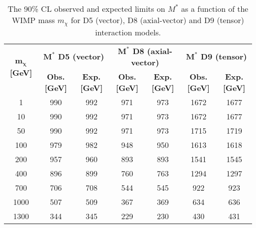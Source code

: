 \begin{sidewaystable}[h!]
\centering
\begin{tabular}{c|cc|cc|cc}
\hline\hline
\multirow{2}{*}{{\bf $\mathbf{m_\chi}$ [GeV]}} & \multicolumn{2}{c|}{\bf $\mathbf{M^*}$ D5 (vector)} & \multicolumn{2}{c|}{\bf $\mathbf{M^*}$ D8 (axial-vector)} & \multicolumn{2}{c}{\bf $\mathbf{M^*}$ D9 (tensor)}\\ 
\cline{2-7}
           & {\bf Obs. [GeV]} & {\bf Exp. [GeV]} & {\bf Obs. [GeV]} & {\bf Exp. [GeV]} & {\bf Obs. [GeV]} & {\bf Exp. [GeV]}\\ 
\hline
    1      &    990 &   992 &   971 &   973 &   1672    &   1677    \\
    10     &    990 &   992 &   971 &   973 &   1672    &   1677    \\
    50     &    990 &   992 &   971 &   973 &   1715    &   1719    \\
    100 &   979 &   982 &   948 &   950 &   1613    &   1618    \\
    200 &   957 &   960 &   893 &   893 &   1541    &   1545    \\
    400 &   896 &   899 &   760 &   763 &   1294    &   1297    \\
    700 &   706 &   708 &   544 &   545 &   922 &   923 \\
    1000    &   507 &   509 &   367 &   369 &   634 &   636 \\
    1300    &   344 &   345 &   229     &   230     &   430 &   431     \\
    \hline\hline
    \end{tabular}
    \caption[The 90\% CL observed and expected limits on $M^*$ as a function of the WIMP mass $m_\chi$ for different interaction models.]{The 90\% CL observed and expected limits on $M^*$ as a function of the WIMP mass $m_\chi$ for D5 (vector), D8 (axial-vector) and D9 (tensor) interaction models.}
    \label{tab:WIMPsEffective_limit_mstar}
    \end{sidewaystable}

